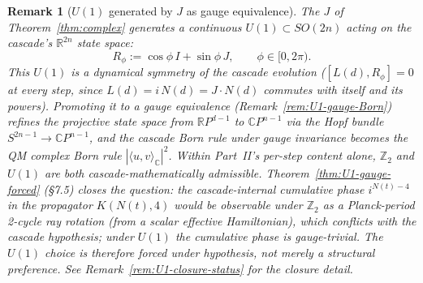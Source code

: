 \documentclass[12pt,a4paper]{article}
\newtheorem{remark}[theorem]{Remark}
\begin{document}
\begin{remark}[$U(1)$ generated by $J$ as gauge equivalence]\label{rem:U1-gauge-J}
The $J$ of Theorem~\ref{thm:complex} generates a continuous
$U(1) \subset SO(2n)$ acting on the cascade's $\mathbb{R}^{2n}$ state
space:
\[
R_\phi := \cos\phi\,I + \sin\phi\,J, \qquad \phi \in [0, 2\pi).
\]
This $U(1)$ is a dynamical \emph{symmetry} of the cascade evolution
($[L(d), R_\phi] = 0$ at every step, since
$L(d) = i\,N(d) = J\cdot N(d)$ commutes with itself and its powers).
Promoting it to a \emph{gauge equivalence}
(Remark~\ref{rem:U1-gauge-Born}) refines the projective state space
from $\mathbb{R}P^{d-1}$ to $\mathbb{C}P^{n-1}$ via the Hopf bundle
$S^{2n-1} \to \mathbb{C}P^{n-1}$, and the cascade Born rule under
gauge invariance becomes the QM complex Born rule
$|\langle u, v\rangle_{\mathbb{C}}|^2$. Within Part~II's per-step
content alone, $\mathbb{Z}_2$ and $U(1)$ are both
cascade-mathematically admissible.
Theorem~\ref{thm:U1-gauge-forced} (\S7.5) closes the question:
the cascade-internal cumulative phase $i^{N(t)-4}$ in the propagator
$K(N(t),4)$ would be observable under $\mathbb{Z}_2$ as a
Planck-period 2-cycle ray rotation (from a scalar effective
Hamiltonian), which conflicts with the cascade hypothesis; under
$U(1)$ the cumulative phase is gauge-trivial. The $U(1)$ choice is
therefore forced under hypothesis, not merely a structural
preference. See Remark~\ref{rem:U1-closure-status} for the closure
detail.
\end{remark}
\end{document}
